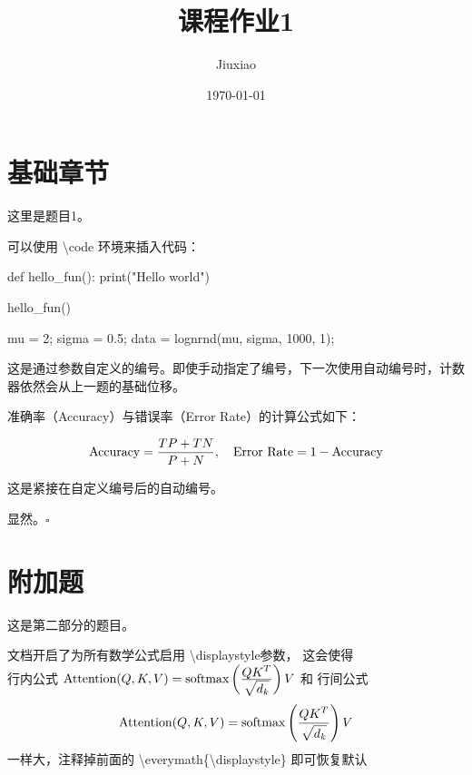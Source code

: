 \documentclass[a4paper, 11pt]{ctexart}
\title{\textbf{课程作业1}}
\author{Jiuxiao}
\date{\today}
\newcounter{problem}[section]
\let\oldfrac\frac
\renewcommand{\frac}[2]{%
  \mathchoice
    {\oldfrac{\displaystyle #1}{\displaystyle #2}} %
    {\oldfrac{\displaystyle #1}{\displaystyle #2}} %
    {\oldfrac{#1}{#2}}                             %
    {\oldfrac{#1}{#2}}                             %
}
\begin{document}
\maketitle

\section{基础章节}

\begin{problem}
这里是题目1。
\end{problem}

\begin{answer}

可以使用 \textbackslash{}code 环境来插入代码：

\begin{code}[Python]
def hello_fun():
    print("Hello world")

hello_fun()
\end{code}
\begin{code}[MatlabGH]
mu = 2;
sigma = 0.5;
data = lognrnd(mu, sigma, 1000, 1);
\end{code}
\end{answer}

\begin{problem}[1.1.1]
这是通过参数自定义的编号。即使手动指定了编号，下一次使用自动编号时，计数器依然会从上一题的基础位移。
\end{problem}

\begin{answer}
准确率（Accuracy）与错误率（Error Rate）的计算公式如下：

\[
\text{Accuracy} = \frac{TP + TN}{P + N}, \quad \text{Error Rate} = 1 - \text{Accuracy}
\]

\end{answer}

\begin{problem}
这是紧接在自定义编号后的自动编号。
\end{problem}
\begin{answer}
    显然。$\square$
\end{answer}

\section{附加题}
\begin{problem}
这是第二部分的题目。
\end{problem}
\begin{answer}
    文档开启了为所有数学公式启用 \textbackslash{}displaystyle参数，
    这会使得\\行内公式 $ \text{Attention}(Q,K,V)=\text{softmax}\left(\frac{QK^T}{\sqrt{d_k}}\right)V $ 和 行间公式
    \[
        \text{Attention}(Q,K,V)=\text{softmax}\left(\frac{QK^T}{\sqrt{d_k}}\right)V
    \]
    一样大，注释掉前面的 \textbackslash{}everymath\{\textbackslash{}displaystyle\} 即可恢复默认
\end{answer}
\end{document}
